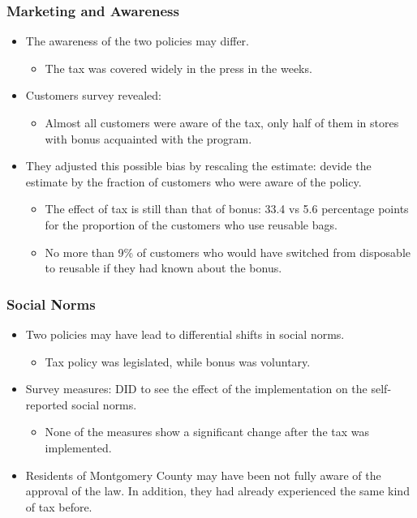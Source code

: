 \documentclass[dvipdfmx,11pt]{beamer}
\begin{document}
\begin{frame}\frametitle{Marketing and Awareness}
  \begin{itemize}
    \item The awareness of the two policies may differ.
    \begin{itemize}
      \item The tax was covered widely in the press in the weeks.
    \end{itemize}
    \item Customers survey revealed:
    \begin{itemize}
      \item Almost all customers were aware of the tax, only half of them in stores with bonus acquainted with the program.
    \end{itemize}
    \item They adjusted this possible bias by rescaling the estimate: devide the estimate by the fraction of customers who were aware of the policy.
    \begin{itemize}
      \item The effect of tax is still than that of bonus: 33.4 vs 5.6 percentage points for the proportion of the customers who use reusable bags.
      \item No more than 9\% of customers who would have switched from disposable to reusable if they had known about the bonus.
    \end{itemize}
  \end{itemize}
\end{frame}

\begin{frame}\frametitle{Social Norms}
  \begin{itemize}
    \item Two policies may have lead to differential shifts in social norms.
    \begin{itemize}
      \item Tax policy was legislated, while bonus was voluntary.
    \end{itemize}
    \item Survey measures: DID to see the effect of the implementation on the self-reported social norms.
    \begin{itemize}
      \item None of the measures show a significant change after the tax was implemented.
    \end{itemize}
    \item Residents of Montgomery County may have been not fully aware of the approval of the law. In addition, they had already experienced the same kind of tax before.
  \end{itemize}
\end{frame}
\end{document}
